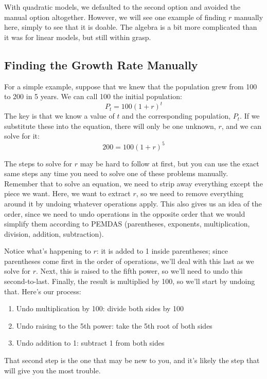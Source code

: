 With quadratic models, we defaulted to the second option and avoided the manual option altogether.  However, we will see one example of finding $r$ manually here, simply to see that it is doable.  The algebra is a bit more complicated than it was for linear models, but still within grasp.

\subsection{Finding the Growth Rate Manually}

For a simple example, suppose that we knew that the population grew from 100 to 200 in 5 years.  We can call 100 the initial population:
\[P_t = 100(1+r)^t\]
The key is that we know a value of $t$ and the corresponding population, $P_t$.  If we substitute these into the equation, there will only be one unknown, $r$, and we can solve for it:
\[200 = 100(1+r)^5\]

The steps to solve for $r$ may be hard to follow at first, but you can use the exact same steps any time you need to solve one of these problems manually.\\

Remember that to solve an equation, we need to strip away everything except the piece we want.  Here, we want to extract $r$, so we need to remove everything around it by undoing whatever operations apply.  This also gives us an idea of the order, since we need to undo operations in the opposite order that we would simplify them according to PEMDAS (parentheses, exponents, multiplication, division, addition, subtraction).

Notice what's happening to $r$: it is added to 1 inside parentheses; since parentheses come first in the order of operations, we'll deal with this last as we solve for $r$.  Next, this is raised to the fifth power, so we'll need to undo this second-to-last.  Finally, the result is multiplied by 100, so we'll start by undoing that.  Here's our process:
\begin{enumerate}
\item Undo multiplication by 100: divide both sides by 100
\item Undo raising to the 5th power: take the 5th root of both sides
\item Undo addition to 1: subtract 1 from both sides
\end{enumerate}

That second step is the one that may be new to you, and it's likely the step that will give you the most trouble.
\pagebreak


